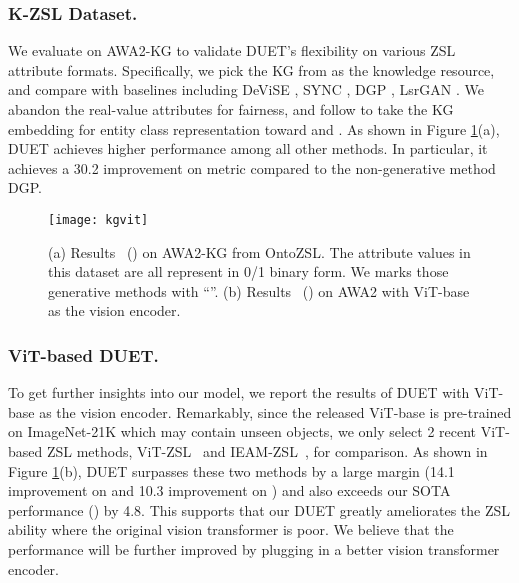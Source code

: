 \documentclass[letterpaper]{article} \usepackage{aaai23}  \usepackage{times}  \usepackage{helvet}  \usepackage{courier}  \usepackage[hyphens]{url}  \usepackage{graphicx} \urlstyle{rm} \def\UrlFont{\rm}  \usepackage{natbib}  \usepackage{caption} \frenchspacing  \setlength{\pdfpagewidth}{8.5in}  \setlength{\pdfpageheight}{11in}  \usepackage{algorithm}
\newcommand{\fy}[1]{{\color{black}#1}}
\begin{document}
\subsubsection{\textbf{K-ZSL Dataset.}}
We evaluate on AWA2-KG \cite{DBLP:conf/www/GengC0PYYJC21} to validate DUET's  flexibility on various ZSL attribute formats.
Specifically,
we pick the KG from \cite{geng2021k} as the knowledge resource, and compare with  baselines
including DeViSE \cite{DBLP:conf/nips/FromeCSBDRM13}, SYNC \cite{changpinyo2016synthesized}, DGP \cite{DBLP:conf/cvpr/KampffmeyerCLWZ19}, LsrGAN \cite{vyas2020leveraging}. 
We abandon the real-value attributes for {fairness}, and follow \cite{DBLP:conf/www/GengC0PYYJC21,DBLP:journals/corr/abs-2206-03739,DBLP:conf/semweb/0007CGPYC21} to take the KG embedding \cite{DBLP:conf/nips/BordesUGWY13} for entity class representation toward  and .
As shown in Figure \ref{fig:kgvit}(a), DUET achieves higher performance \fy{among} all other methods. In particular, {it achieves \fy{a} 30.2 improvement \fy{on} metric } compared to the non-generative method DGP.
\begin{figure}[htbp]
  \centering
  \vspace{-5pt}
  \texttt{[image: kgvit]}
  \caption{ (a) Results ~() on AWA2-KG from OntoZSL. The attribute values in this dataset are all represent in 0/1 binary form. We marks those generative methods with ``''. (b) Results ~() on AWA2 with ViT-base as the vision encoder.}
  \label{fig:kgvit}
  \vspace{-7pt}
\end{figure}
\subsubsection{\textbf{{ViT-based DUET.}}}
To get further insights into our model, we report the results of DUET with ViT-base \cite{DBLP:conf/iclr/DosovitskiyB0WZ21} as the vision encoder.
Remarkably, since the released ViT-base is pre-trained on ImageNet-21K \fy{which} may contain unseen objects,
we only select 2 recent ViT-based ZSL methods, ViT-ZSL~\cite{DBLP:journals/corr/abs-2108-00045} and IEAM-ZSL~\cite{DBLP:conf/eccv/NarayanGKSS20}, for comparison.
As shown in Figure \ref{fig:kgvit}(b), DUET surpasses these two methods by a large margin (14.1 improvement \fy{on}  and 10.3 improvement \fy{on} ) and also exceeds our SOTA performance () by 4.8. 
This supports that our DUET greatly ameliorates the ZSL ability where the original vision transformer is poor.
We believe that the performance will be further improved \fy{by plugging in a better vision transformer encoder.}
\end{document}
